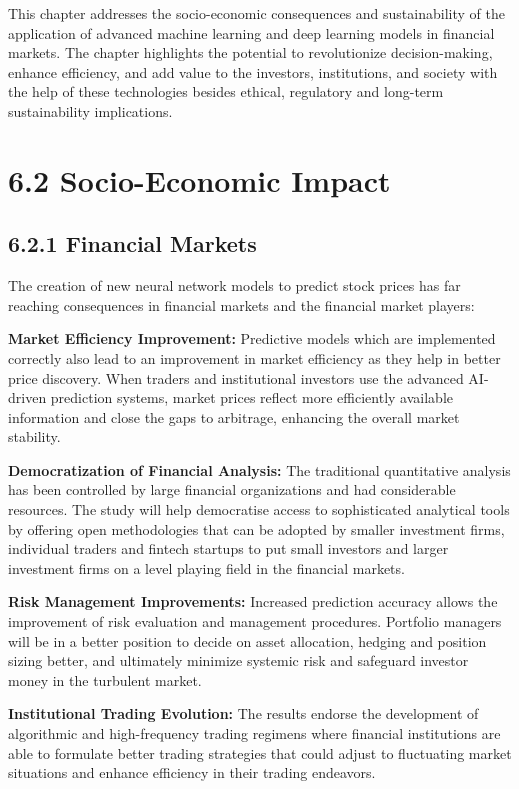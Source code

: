 \documentclass[12pt,a4paper]{report}
\begin{document}
This chapter addresses the socio-economic consequences and sustainability of the application of advanced machine learning and deep learning models in financial markets. The chapter highlights the potential to revolutionize decision-making, enhance efficiency, and add value to the investors, institutions, and society with the help of these technologies besides ethical, regulatory and long-term sustainability implications.

\section{6.2 Socio-Economic Impact}
\subsection{6.2.1 Financial Markets}
The creation of new neural network models to predict stock prices has far reaching consequences in financial markets and the financial market players:

\textbf{Market Efficiency Improvement:} Predictive models which are implemented correctly also lead to an improvement in market efficiency as they help in better price discovery. When traders and institutional investors use the advanced AI-driven prediction systems, market prices reflect more efficiently available information and close the gaps to arbitrage, enhancing the overall market stability.

\textbf{Democratization of Financial Analysis:} The traditional quantitative analysis has been controlled by large financial organizations and had considerable resources. The study will help democratise access to sophisticated analytical tools by offering open methodologies that can be adopted by smaller investment firms, individual traders and fintech startups to put small investors and larger investment firms on a level playing field in the financial markets.

\textbf{Risk Management Improvements:} Increased prediction accuracy allows the improvement of risk evaluation and management procedures. Portfolio managers will be in a better position to decide on asset allocation, hedging and position sizing better, and ultimately minimize systemic risk and safeguard investor money in the turbulent market.

\textbf{Institutional Trading Evolution:} The results endorse the development of algorithmic and high-frequency trading regimens where financial institutions are able to formulate better trading strategies that could adjust to fluctuating market situations and enhance efficiency in their trading endeavors.
\end{document}
